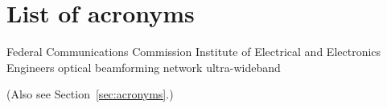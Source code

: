 \chapter{List of acronyms}

\begin{acronym}[TDMAAA]
					{Federal Communications Commission}
					{Institute of Electrical and Electronics Engineers}
					{optical beamforming network}	
					{ultra-wideband}
\end{acronym}

\noindent (Also see Section~\ref{sec:acronyms}.)